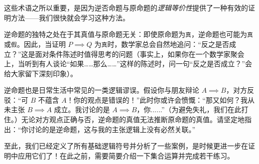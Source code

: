 这些术语之所以重要，是因为逆否命题与原命题的\emph{逻辑等价性}提供了一种有效的证明方法——我们很快就会学习这种方法。

逆命题的独特之处在于其真值与原命题无关：即使原命题为\verb|真|，逆命题也可能为\verb|真|或\verb|假|。因此，当证明 $P \implies Q$ 为\verb|真|时，数学家总会自然地追问：``反之是否成立？''这是面对条件陈述时值得思考的问题（事实上，如果你在一个数学家聚会上，当听到有人谈论``如果……那么……''这样的陈述时，问一句``反之是否成立？''会给大家留下深刻印象）。

逆命题也是日常生活中常见的一类逻辑谬误。假设你与朋友辩论 $A \implies B$，对方反驳：``可 $B$ 不蕴含 $A$！你的观点是错误的！''此时你或许会愤慨：``那又如何？我从未主张 $B \implies A$ 成立。我讨论的是 $A \implies B$，你......''（为避免失礼，我们在此打住。）无论对方观点正确与否，逆命题的真值无法推断原命题的真值。请坚定地指出：``你讨论的是逆命题，这与我的主张逻辑上没有必然关联。''

至此，我们已经定义了所有基础逻辑符号并分析了一些案例，是时候更进一步在证明中应用它们了！在此之前，需要简要介绍一下集合运算并完成若干练习。
